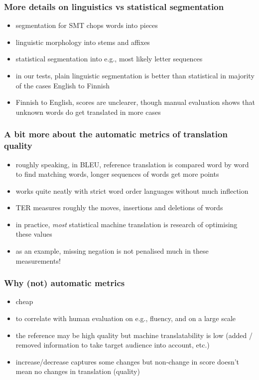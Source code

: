 \documentclass{beamer}
\begin{document}
\begin{frame}
    \frametitle{More details on linguistics vs statistical segmentation}
    \begin{itemize}
        \item segmentation for SMT chops words into
            pieces
        \item linguistic morphology into stems and affixes
        \item statistical segmentation into e.g., most likely
            letter sequences
        \item in our tests, plain linguistic segmentation
            is better than statistical in majority
            of the cases English to Finnish
        \item Finnish to English, scores are unclearer, though manual evaluation shows that unknown
            words do get translated in more cases
    \end{itemize}
\end{frame}

\begin{frame}
    \frametitle{A bit more about the automatic metrics of translation quality}
    \begin{itemize}
        \item roughly speaking, in BLEU, reference translation is compared
            word by word to find matching words,
            longer sequences of words get more points
        \item works quite neatly with strict word order languages without
            much inflection
        \item TER measures roughly the moves, insertions and deletions of
            words
        \item in practice, \emph{most} statistical machine translation is research of
            optimising these values
        \item as an example, missing negation is not
            penalised much in these measurements!
    \end{itemize}
\end{frame}



\begin{frame}
    \frametitle{Why (not) automatic metrics}
    \begin{itemize}
        \item cheap
        \item to correlate with human
            evaluation on e.g., fluency, and on a large scale
        \item the reference may be high quality but machine translatability
            is low (added / removed information to take target audience into
            account, etc.)
        \item increase/decrease captures some changes
            but non-change in score doesn't mean no
            changes in translation (quality)
    \end{itemize}
\end{frame}
\end{document}
